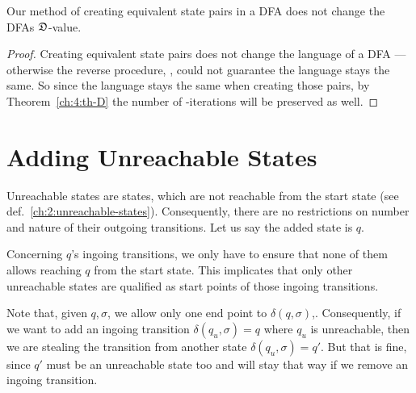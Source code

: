 \begin{corollary}
	Our method of creating equivalent state pairs in a DFA does not change the DFAs $\mathfrak{D}$-value.
\end{corollary}

\begin{proof}
	Creating equivalent state pairs does not change the language of a DFA --- otherwise the reverse procedure, \MinAlg, could not guarantee the language stays the same. So since the language stays the same when creating those pairs, by Theorem~\ref{ch:4:th-D} the number of \CompDist-iterations will be preserved as well.
\end{proof}

\section{Adding Unreachable States}

Unreachable states are states, which are not reachable from the start state (see def.~\ref{ch:2:unreachable-states}). Consequently, there are no restrictions on number and nature of their outgoing transitions. Let us say the added state is $q$.

Concerning $q$'s ingoing transitions, we only have to ensure that none of them allows reaching $q$ from the start state. This implicates that only other unreachable states are qualified as start points of those ingoing transitions.

Note that, given $q, \sigma$, we allow only one end point to $\delta(q, \sigma)$,. Consequently, if we want to add an ingoing transition $\delta(q_u, \sigma) = q$ where $q_u$ is unreachable, then we are stealing the transition from another state $\delta(q_u, \sigma) = q'$. But that is fine, since $q'$ must be an unreachable state too and will stay that way if we remove an ingoing transition.

